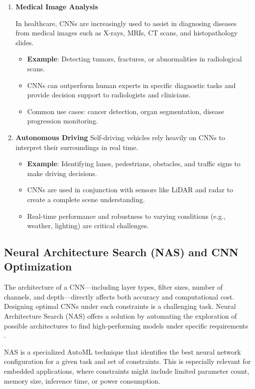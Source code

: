 \begin{enumerate}
\begin{itemize}
    \end{itemize}
   
    \item \textbf{Medical Image Analysis}


    In healthcare, CNNs are increasingly used to assist in diagnosing diseases from medical images such as X-rays, MRIs, CT scans, and histopathology slides.
    \begin{itemize}
        \item \textbf{Example}: Detecting tumors, fractures, or abnormalities in radiological scans.
        \item CNNs can outperform human experts in specific diagnostic tasks and provide decision support to radiologists and clinicians.
        \item Common use cases: cancer detection, organ segmentation, disease progression monitoring.
    \end{itemize}
   
    \item \textbf{Autonomous Driving}
    Self-driving vehicles rely heavily on CNNs to interpret their surroundings in real time.
    \begin{itemize}
        \item \textbf{Example}: Identifying lanes, pedestrians, obstacles, and traffic signs to make driving decisions.
        \item CNNs are used in conjunction with sensors like LiDAR and radar to create a complete scene understanding.
        \item Real-time performance and robustness to varying conditions (e.g., weather, lighting) are critical challenges.
    \end{itemize}
\end{enumerate}
\subsection{Neural Architecture Search (NAS) and CNN Optimization}

The architecture of a CNN---including layer types, filter sizes, number of channels, and depth---directly affects both accuracy and computational cost. Designing optimal CNNs under such constraints is a challenging task. Neural Architecture Search (NAS) offers a solution by automating the exploration of possible architectures to find high-performing models under specific requirements \cite{pau2023quantitative}.

NAS is a specialized AutoML technique that identifies the best neural network configuration for a given task and set of constraints. This is especially relevant for embedded applications, where constraints might include limited parameter count, memory size, inference time, or power consumption.

